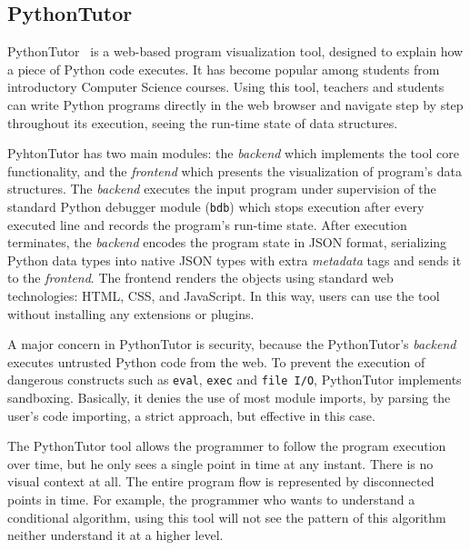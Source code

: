 \subsection{PythonTutor}
\label{subsec:pythontutor}
PythonTutor~\cite{GuoSIGCSE2013} is a web-based program visualization tool, designed to explain how a piece of Python code executes. It has become popular among students from introductory Computer Science courses. Using this tool, teachers and students can write Python programs directly in the web browser and navigate step by step throughout its execution, seeing the run-time state of data structures.

PyhtonTutor has two main modules: the \textit{backend} which implements the tool core functionality, and the \textit{frontend} which presents the visualization of program's data structures. The \textit{backend} executes the input program under supervision of the standard Python debugger module (\texttt{bdb}) which stops execution after every executed line and records the program's run-time state. After execution terminates, the \textit{backend} encodes the program state in JSON format, serializing Python data types into native JSON types with extra \textit{metadata} tags and sends it to the \textit{frontend}. The frontend renders the objects using standard web technologies: HTML, CSS, and JavaScript. In this way, users can use the tool without installing any extensions or plugins.

A major concern in PythonTutor is security, because the PythonTutor's \textit{backend} executes untrusted Python code from the web. To prevent the execution of dangerous constructs such as {\tt eval}, {\tt exec} and {\tt file I/O}, PythonTutor implements sandboxing. Basically, it denies the use of most module imports, by parsing the user's code importing, a strict approach, but effective in this case.

The PythonTutor tool allows the programmer to follow the program execution over time, but he only sees a single point in time at any instant. There is no visual context at all. The entire program flow is represented by disconnected points in time. For example, the programmer who wants to understand a conditional algorithm, using this tool will not see the pattern of this algorithm neither understand it at a higher level.
